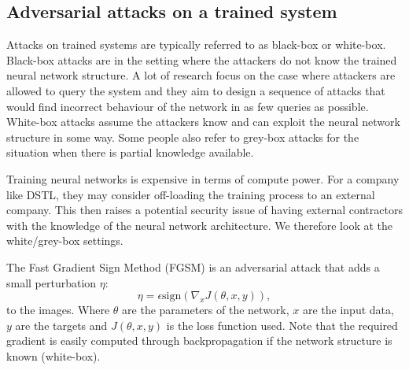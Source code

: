 \subsection{Adversarial attacks on a trained system}

Attacks on trained systems are typically referred to as black-box or white-box. Black-box attacks are in the setting where the attackers do not know the trained neural network structure. A lot of research focus on the case where attackers are allowed to query the system and they aim to design a sequence of attacks that would find incorrect behaviour of the network in as few queries as possible. White-box attacks assume the attackers know and can exploit the neural network structure in some way. Some people also refer to grey-box attacks for the situation when there is partial knowledge available.

Training neural networks is expensive in terms of compute power. For a company like DSTL, they may consider off-loading the training process to an external company. This then raises a potential security issue of having external contractors with the knowledge of the neural network architecture. We therefore look at the white/grey-box settings.

The Fast Gradient Sign Method (FGSM) \cite{Goodfellow14} is an adversarial attack that adds a small perturbation \(\eta\):
\begin{equation}
\eta = \epsilon \text{sign}(\nabla_x J(\theta,x,y)),\label{eq:fgsm}
\end{equation}
to the images. Where \(\theta\) are the parameters of the network, \(x\) are the input data, \(y\) are the targets and \(J(\theta,x,y)\) is the loss function used. Note that the required gradient is easily computed through backpropagation if the network structure is known (white-box).

